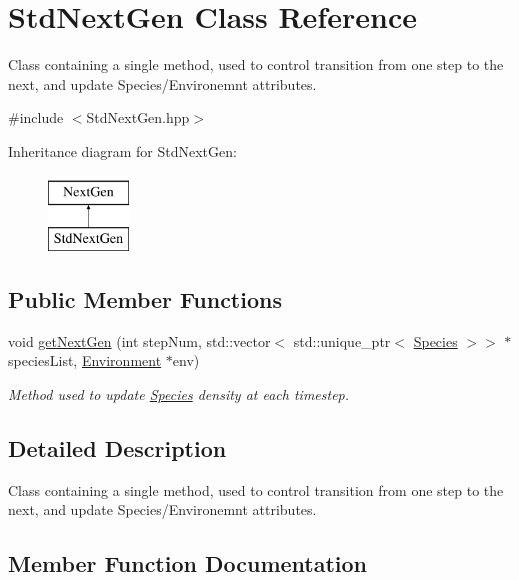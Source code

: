 \hypertarget{classStdNextGen}{}\section{Std\+Next\+Gen Class Reference}
\label{classStdNextGen}


Class containing a single method, used to control transition from one step to the next, and update Species/\+Environemnt attributes.  




{\ttfamily \#include $<$Std\+Next\+Gen.\+hpp$>$}

Inheritance diagram for Std\+Next\+Gen\+:\begin{figure}[H]
\begin{center}
\leavevmode
\includegraphics[height=2.000000cm]{classStdNextGen}
\end{center}
\end{figure}
\subsection*{Public Member Functions}
\begin{DoxyCompactItemize}
\item 
void \hyperlink{classStdNextGen_a2253fef9e33f6fe5f2e84f4dc89cfcd2}{get\+Next\+Gen} (int step\+Num, std\+::vector$<$ std\+::unique\+\_\+ptr$<$ \hyperlink{classSpecies}{Species} $>$$>$ $\ast$species\+List, \hyperlink{classEnvironment}{Environment} $\ast$env)
\begin{DoxyCompactList}\small\item\em Method used to update \hyperlink{classSpecies}{Species} density at each timestep. \end{DoxyCompactList}\end{DoxyCompactItemize}


\subsection{Detailed Description}
Class containing a single method, used to control transition from one step to the next, and update Species/\+Environemnt attributes. 

\subsection{Member Function Documentation}
\hypertarget{classStdNextGen_a2253fef9e33f6fe5f2e84f4dc89cfcd2}{}\label{classStdNextGen_a2253fef9e33f6fe5f2e84f4dc89cfcd2} 
